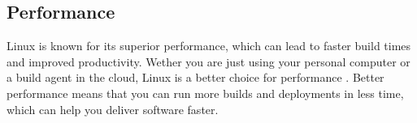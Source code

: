 \subsection{Performance}
Linux is known for its superior performance, which can lead to faster build times and improved productivity.
Wether you are just using your personal computer or a build agent in the cloud, Linux is a better choice for performance \autocite{linkedin2}.
Better performance means that you can run more builds and deployments in less time, which can help you deliver software faster.

